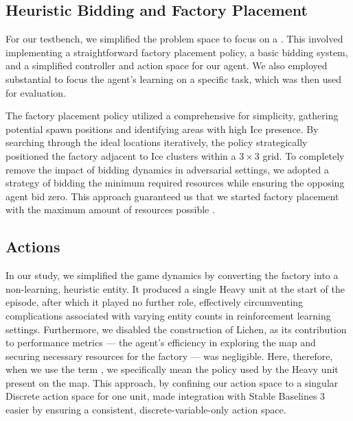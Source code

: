 \subsection{Heuristic Bidding and Factory Placement}
\label{subsec:single-bidding-factory}

\noindent For our testbench, we simplified the problem space to focus on a . This involved implementing a straightforward factory placement policy, a basic bidding system, and a simplified controller and action space for our agent. We also employed substantial  to focus the agent's learning on a specific task, which was then used for evaluation.

\bigskip 

\noindent The factory placement policy utilized a comprehensive  for simplicity, gathering potential spawn positions and identifying areas with high Ice presence. By searching through the ideal locations iteratively, the policy strategically positioned the factory adjacent to Ice clusters within a $3 \times 3$ grid. To completely remove the impact of bidding dynamics in adversarial settings, we adopted a strategy of bidding the minimum required resources while ensuring the opposing agent bid zero. This approach guaranteed us that we started factory placement with the maximum amount of resources possible \protect\footnotemark.



\subsection{Actions}
\label{subsec:single-environment}

\noindent In our study, we simplified the game dynamics by converting the factory into a non-learning, heuristic entity. It produced a single Heavy unit at the start of the episode, after which it played no further role, effectively circumventing complications associated with varying entity counts in reinforcement learning settings. Furthermore, we disabled the construction of Lichen, as its contribution to performance metrics — the agent's efficiency in exploring the map and securing necessary resources for the factory — was negligible. Here, therefore, when we use the term , we specifically mean the policy used by the Heavy unit present on the map. This approach, by confining our action space to a singular Discrete action space for one unit, made integration with Stable Baselines 3 easier by ensuring a consistent, discrete-variable-only action space.


